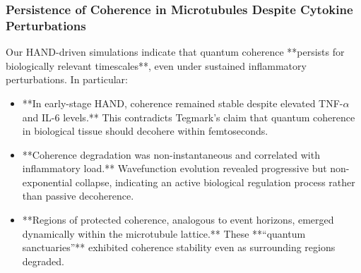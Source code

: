 \subsubsection{Persistence of Coherence in Microtubules Despite Cytokine Perturbations}
Our HAND-driven simulations indicate that quantum coherence **persists for biologically relevant timescales**, even under sustained inflammatory perturbations. In particular:
\begin{itemize}
    \item **In early-stage HAND, coherence remained stable despite elevated TNF-$\alpha$ and IL-6 levels.** This contradicts Tegmark’s claim that quantum coherence in biological tissue should decohere within femtoseconds.
    \item **Coherence degradation was non-instantaneous and correlated with inflammatory load.** Wavefunction evolution revealed progressive but non-exponential collapse, indicating an active biological regulation process rather than passive decoherence.
    \item **Regions of protected coherence, analogous to event horizons, emerged dynamically within the microtubule lattice.** These **“quantum sanctuaries”** exhibited coherence stability even as surrounding regions degraded.
\end{itemize}
